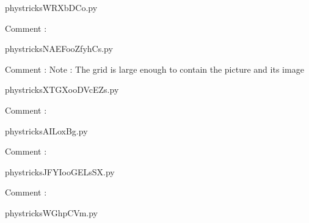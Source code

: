     \newcommand{\CaptionFigWRXbDCo}{<+Type your caption here+>}
    \begin{center}
        
    \end{center}
    phystricksWRXbDCo.py

    Comment : 

    \clearpage
    


    \newcommand{\CaptionFigNAEFooZfyhCs}{<+Type your caption here+>}
    \begin{center}
        
    \end{center}
    phystricksNAEFooZfyhCs.py

    Comment : Note : The grid is large enough to contain the picture and its image

    \clearpage
    


    \newcommand{\CaptionFigXTGXooDVcEZs}{<+Type your caption here+>}
    \begin{center}
        
    \end{center}
    phystricksXTGXooDVcEZs.py

    Comment : 

    \clearpage
    


    \newcommand{\CaptionFigAILoxBg}{<+Type your caption here+>}
    \begin{center}
        
    \end{center}
    phystricksAILoxBg.py

    Comment : 

    \clearpage
    


    \newcommand{\CaptionFigJFYIooGELsSX}{<+Type your caption here+>}
    \begin{center}
        
    \end{center}
    phystricksJFYIooGELsSX.py

    Comment : 

    \clearpage
    


    \newcommand{\CaptionFigWGhpCVm}{<+Type your caption here+>}
    \begin{center}
        
    \end{center}
    phystricksWGhpCVm.py

